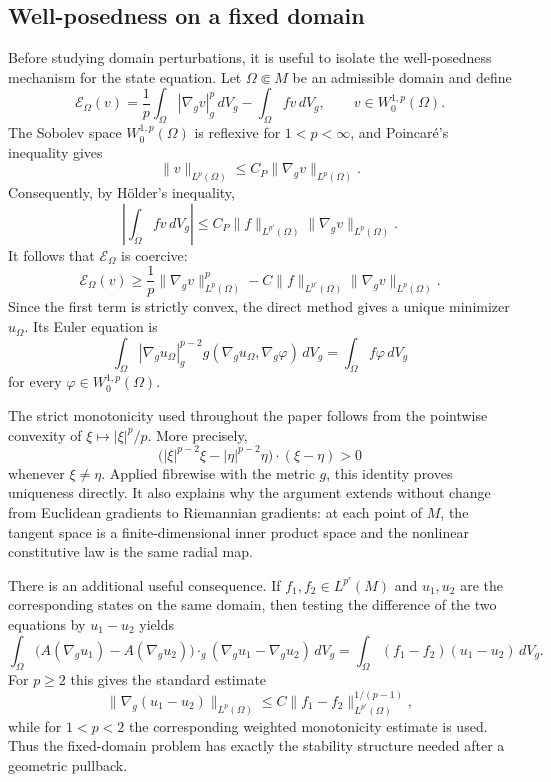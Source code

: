 \documentclass{article}
\begin{document}

\subsection{Well-posedness on a fixed domain}

Before studying domain perturbations, it is useful to isolate the
well-posedness mechanism for the state equation. Let $\Omega\Subset M$ be
an admissible domain and define
\[
\mathcal E_\Omega(v)
=
\frac1p\int_\Omega |\nabla_gv|_g^p\,dV_g
-\int_\Omega fv\,dV_g,
\qquad v\in W_0^{1,p}(\Omega).
\]
The Sobolev space $W_0^{1,p}(\Omega)$ is reflexive for
$1<p<\infty$, and Poincar\'e's inequality gives
\[
\|v\|_{L^p(\Omega)}
\leq C_P\|\nabla_gv\|_{L^p(\Omega)}.
\]
Consequently, by H\"older's inequality,
\[
\left|\int_\Omega fv\,dV_g\right|
\leq
C_P\|f\|_{L^{p'}(\Omega)}
\|\nabla_gv\|_{L^p(\Omega)}.
\]
It follows that $\mathcal E_\Omega$ is coercive:
\[
\mathcal E_\Omega(v)
\geq
\frac1p\|\nabla_gv\|_{L^p(\Omega)}^p
-
C\|f\|_{L^{p'}(\Omega)}
\|\nabla_gv\|_{L^p(\Omega)}.
\]
Since the first term is strictly convex, the direct method gives a
unique minimizer $u_\Omega$. Its Euler equation is
\[
\int_\Omega
|\nabla_gu_\Omega|_g^{p-2}
g(\nabla_gu_\Omega,\nabla_g\varphi)\,dV_g
=
\int_\Omega f\varphi\,dV_g
\]
for every $\varphi\in W_0^{1,p}(\Omega)$.

The strict monotonicity used throughout the paper follows from the
pointwise convexity of $\xi\mapsto|\xi|^p/p$. More precisely,
\[
\bigl(|\xi|^{p-2}\xi-|\eta|^{p-2}\eta\bigr)\cdot(\xi-\eta)>0
\]
whenever $\xi\neq\eta$. Applied fibrewise with the metric $g$, this
identity proves uniqueness directly. It also explains why the argument
extends without change from Euclidean gradients to Riemannian gradients:
at each point of $M$, the tangent space is a finite-dimensional inner
product space and the nonlinear constitutive law is the same radial map.

There is an additional useful consequence. If $f_1,f_2\in L^{p'}(M)$ and
$u_1,u_2$ are the corresponding states on the same domain, then testing
the difference of the two equations by $u_1-u_2$ yields
\[
\int_\Omega
\bigl(A(\nabla_gu_1)-A(\nabla_gu_2)\bigr)
\cdot_g(\nabla_gu_1-\nabla_gu_2)\,dV_g
=
\int_\Omega(f_1-f_2)(u_1-u_2)\,dV_g.
\]
For $p\ge2$ this gives the standard estimate
\[
\|\nabla_g(u_1-u_2)\|_{L^p(\Omega)}
\leq
C\|f_1-f_2\|_{L^{p'}(\Omega)}^{1/(p-1)},
\]
while for $1<p<2$ the corresponding weighted monotonicity estimate is
used. Thus the fixed-domain problem has exactly the stability structure
needed after a geometric pullback.
\end{document}
